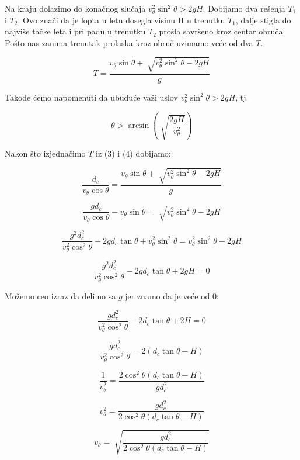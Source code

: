 \documentclass[a4paper, 12pt]{article}
\begin{document}
Na kraju dolazimo do konačnog slučaja ${v_{\theta}^2 \sin^2 \theta > 2 g H}$. Dobijamo dva rešenja $T_1$ i $T_2$. Ovo znači da je lopta u letu dosegla visinu H u trenutku $T_1$, dalje stigla do najviše tačke leta i pri padu u trenutku $T_2$ prošla savršeno kroz centar obruča. Pošto nas zanima trenutak prolaska kroz obruč uzimamo veće od dva $T$.

\begin{equation}
T = \dfrac{v_{\theta} \sin \theta + \sqrt[]{v_{\theta}^2 \sin^2 \theta - 2 g H}}{g}
\end{equation}

Takođe ćemo napomenuti da ubuduće važi uslov ${v_{\theta}^2 \sin^2 \theta > 2 g H}$, tj.

\begin{equation}
{\theta} > \arcsin(\sqrt[]{\dfrac{2 g H}{v_{\theta}^2}})
\end{equation}


Nakon što izjednačimo $T$ iz (3) i (4) dobijamo:

\[\dfrac{d_c}{v_\theta \cos \theta} = \dfrac{v_{\theta} \sin \theta + \sqrt[]{v_{\theta}^2 \sin^2 \theta - 2 g H}}{g}\]

\[\dfrac{g d_c}{v_\theta \cos \theta} - v_{\theta} \sin \theta = \sqrt[]{v_{\theta}^2 \sin^2 \theta - 2 g H}\]

\[\dfrac{g^2 d_c^2}{v_\theta^2 \cos^2 \theta} - 2 g d_c \tan \theta + v_{\theta}^2 \sin^2 \theta = v_{\theta}^2 \sin^2 \theta - 2 g H\]


\[\dfrac{g^2 d_c^2}{v_\theta^2 \cos^2 \theta} - 2 g d_c \tan \theta + 2 g H = 0\]

Možemo ceo izraz da delimo sa $g$ jer znamo da je veće od 0:

\begin{equation}
\dfrac{g d_c^2}{v_\theta^2 \cos^2 \theta} - 2 d_c \tan \theta + 2 H = 0
\end{equation}

\[\dfrac{g d_c^2}{v_\theta^2 \cos^2 \theta} = 2 (d_c \tan \theta - H)\]

\[\dfrac{1}{v_\theta^2} = \dfrac{2 \cos^2 \theta (d_c \tan \theta - H)}{g d_c^2}\]

\[v_\theta^2 = \dfrac{g d_c^2}{2 \cos^2 \theta (d_c \tan \theta - H)}\]


\begin{equation}
v_\theta = \sqrt[]{\dfrac{g d_c^2}{2 \cos^2 \theta (d_c \tan \theta - H)}}
\end{equation}
\end{document}
